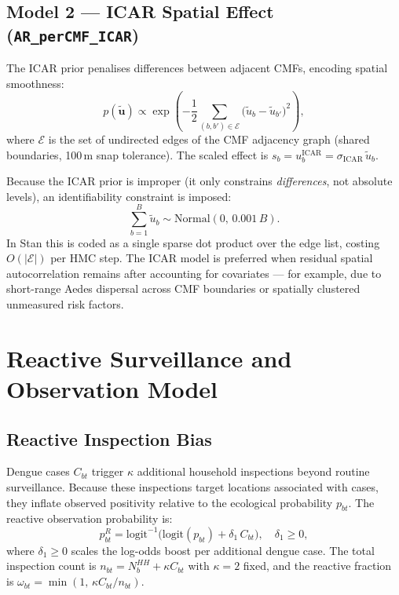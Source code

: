 \documentclass[12pt,a4paper]{article}
\begin{document}
\subsection{Model 2 --- ICAR Spatial Effect (\texttt{AR\_perCMF\_ICAR})}

The ICAR prior penalises differences between adjacent CMFs, encoding spatial smoothness:
\begin{equation}
  p(\tilde{\mathbf{u}}) \propto \exp\!\left(-\frac{1}{2} \sum_{(b,b') \in \mathcal{E}} \bigl(\tilde{u}_b - \tilde{u}_{b'}\bigr)^2\right),
\end{equation}
where $\mathcal{E}$ is the set of undirected edges of the CMF adjacency graph (shared boundaries,
100\,m snap tolerance). The scaled effect is $s_b = u_b^{\text{ICAR}} = \sigma_{\text{ICAR}}\,\tilde{u}_b$.

Because the ICAR prior is improper (it only constrains \emph{differences}, not absolute levels),
an identifiability constraint is imposed:
\begin{equation}
  \sum_{b=1}^{B} \tilde{u}_b \sim \text{Normal}(0,\, 0.001\,B).
\end{equation}
In Stan this is coded as a single sparse dot product over the edge list, costing $O(|\mathcal{E}|)$
per HMC step. The ICAR model is preferred when residual spatial autocorrelation remains after
accounting for covariates --- for example, due to short-range Aedes dispersal across CMF
boundaries or spatially clustered unmeasured risk factors.

\section{Reactive Surveillance and Observation Model}

\subsection{Reactive Inspection Bias}

Dengue cases $C_{bt}$ trigger $\kappa$ additional household inspections beyond routine surveillance.
Because these inspections target locations associated with cases, they inflate observed positivity
relative to the ecological probability $p_{bt}$. The reactive observation probability is:
\begin{equation}
  p_{bt}^R = \text{logit}^{-1}\!\bigl(\text{logit}(p_{bt}) + \delta_1\, C_{bt}\bigr),
  \quad \delta_1 \geq 0,
\end{equation}
where $\delta_1 \geq 0$ scales the log-odds boost per additional dengue case. The total inspection count is $n_{bt} = N_b^{HH} + \kappa C_{bt}$ with $\kappa = 2$
fixed, and the reactive fraction is $\omega_{bt} = \min(1,\, \kappa C_{bt} / n_{bt})$.
\end{document}
